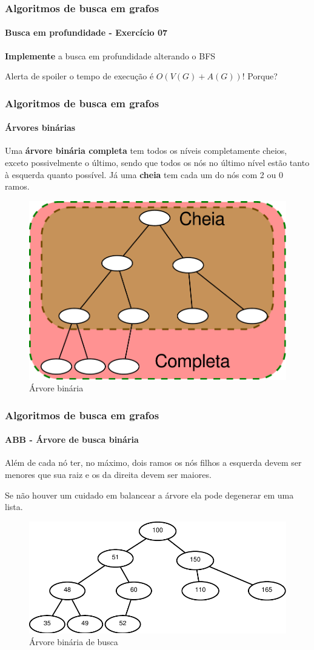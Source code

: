 \begin{frame}
	\frametitle{Algoritmos de busca em grafos}
	\framesubtitle{Busca em profundidade - Exercício 07}
	\par \textbf{Implemente} a busca em profundidade alterando o BFS
	\par \alert{Alerta de spoiler} o tempo de execução é $O(V(G)+A(G))$! Porque?
\end{frame}

\begin{frame}
	\frametitle{Algoritmos de busca em grafos}
	\framesubtitle{Árvores binárias}
	\par Uma \textbf{árvore binária completa} tem todos os níveis completamente cheios, exceto possivelmente o último, sendo que todos os nós no último nível estão tanto à esquerda quanto possível. Já uma \textbf{cheia} tem cada um do nós com 2 ou 0 ramos. 
	\begin{figure}
		\centering
		\includegraphics[width=0.5\linewidth]{images/arvoreBinaria}
		\caption{Árvore binária}
		\label{fig:arvorebinaria}
	\end{figure}
\end{frame}

\begin{frame}
	\frametitle{Algoritmos de busca em grafos}
	\framesubtitle{ABB - Árvore de busca binária}
	\par Além de cada nó ter, no máximo, dois ramos os nós filhos a esquerda devem ser menores que sua raiz e os da direita devem ser maiores.
	\par Se não houver um cuidado em balancear a árvore ela pode degenerar em uma lista.
	\begin{figure}
		\centering
		\includegraphics[width=0.6\linewidth]{images/arvoreBinariaBusca}
		\caption{Árvore binária de busca}
		\label{fig:arvorebinariabusca}
	\end{figure}
\end{frame}

